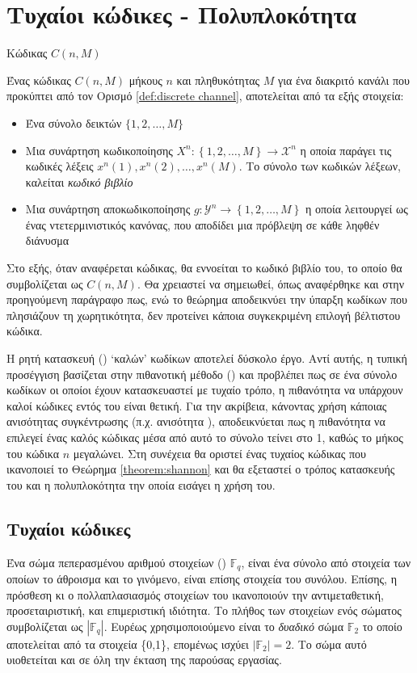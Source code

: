 \section{Τυχαίοι κώδικες - Πολυπλοκότητα}
\begin{definition}{Κώδικας $C(n,M)$}

Ένας κώδικας $C(n,M)$ μήκους $n$ και πληθυκότητας $M$ για ένα διακριτό κανάλι που προκύπτει από τον Ορισμό \ref{def:discrete channel}, αποτελείται από τα εξής στοιχεία:
\begin{itemize}
\item Ένα σύνολο δεικτών $\lbrace1, 2, \ldots, M\rbrace$ 
\item Μια συνάρτηση κωδικοποίησης $X^n:\left\lbrace1, 2, \ldots, M\right\rbrace\to\mathcal{X}^n$ η οποία παράγει τις κωδικές λέξεις $x^n\left(1\right), x^n\left(2\right), \ldots, x^n\left(M\right)$. Το σύνολο των κωδικών λέξεων, καλείται \textit{κωδικό βιβλίο}
\item Μια συνάρτηση αποκωδικοποίησης $g:\mathcal{Y}^n\to\left\lbrace1, 2, \ldots, M\right\rbrace$ η οποία λειτουργεί ως ένας ντετερμινιστικός κανόνας, που αποδίδει μια πρόβλεψη σε κάθε ληφθέν διάνυσμα
\end{itemize}
\label{def:code}
\end{definition}

Στο εξής, όταν αναφέρεται κώδικας, θα εννοείται το κωδικό βιβλίο του, το οποίο θα συμβολίζεται ως $C(n,M)$. Θα χρειαστεί να σημειωθεί, όπως αναφέρθηκε και στην προηγούμενη παράγραφο πως, ενώ το θεώρημα  αποδεικνύει την ύπαρξη κωδίκων που πλησιάζουν τη χωρητικότητα, δεν προτείνει κάποια συγκεκριμένη επιλογή βέλτιστου κώδικα.

Η ρητή κατασκευή () \enquote*{καλών} κωδίκων αποτελεί δύσκολο έργο. Αντί αυτής, η τυπική προσέγγιση βασίζεται στην πιθανοτική μέθοδο () και προβλέπει πως σε ένα σύνολο κωδίκων οι οποίοι έχουν κατασκευαστεί με τυχαίο τρόπο, η πιθανότητα να υπάρχουν καλοί κώδικες εντός του είναι θετική. Για την ακρίβεια, κάνοντας χρήση κάποιας ανισότητας συγκέντρωσης (π.χ. ανισότητα ), αποδεικνύεται πως η πιθανότητα να επιλεγεί ένας καλός κώδικας μέσα από αυτό το σύνολο τείνει στο 1, καθώς το μήκος του κώδικα $n$ μεγαλώνει. Στη συνέχεια θα οριστεί ένας τυχαίος κώδικας που ικανοποιεί το Θεώρημα \ref{theorem:shannon} και θα εξεταστεί ο τρόπος κατασκευής του και η πολυπλοκότητα την οποία εισάγει η χρήση του.

\subsection{Τυχαίοι κώδικες}
Ένα σώμα πεπερασμένου αριθμού στοιχείων () $\mathbb{F}_q$, είναι ένα σύνολο από στοιχεία των οποίων το άθροισμα και το γινόμενο, είναι επίσης στοιχεία του συνόλου. Επίσης, η πρόσθεση κι ο πολλαπλασιασμός στοιχείων του ικανοποιούν την αντιμεταθετική, προσεταιριστική, και επιμεριστική ιδιότητα. Tο πλήθος των στοιχείων ενός σώματος συμβολίζεται ως $|\mathbb{F}_q|$. Ευρέως χρησιμοποιούμενο είναι το \textit{δυαδικό} σώμα $\mathbb{F}_2$ το οποίο αποτελείται από τα στοιχεία \{0,1\}, επομένως ισχύει $|\mathbb{F}_2|=2$. Το σώμα αυτό υιοθετείται και σε όλη την έκταση της παρούσας εργασίας.


